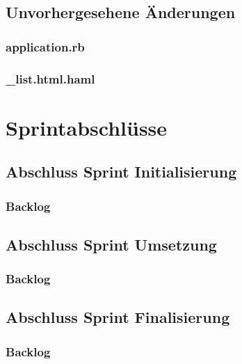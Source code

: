 \section{Unvorhergesehene Änderungen}
\subsection{application.rb}
\subsection{\_list.html.haml}

\chapter{Sprintabschlüsse}

\section{Abschluss Sprint Initialisierung}
\subsection{Backlog}

\section{Abschluss Sprint Umsetzung}
\subsection{Backlog}

\section{Abschluss Sprint Finalisierung}
\subsection{Backlog}


